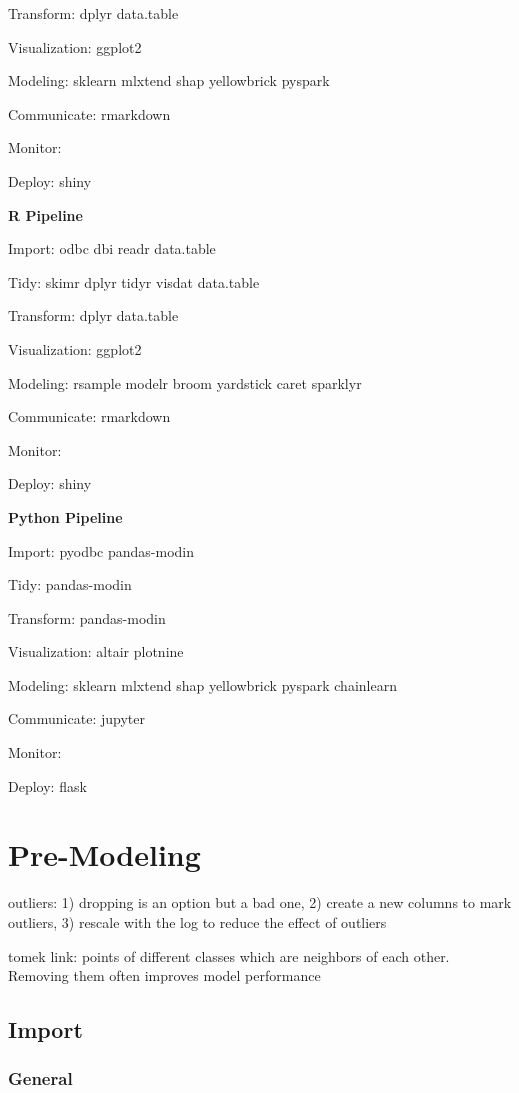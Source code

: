 \documentclass[]{book}
\begin{document}
Transform: dplyr data.table

Visualization: ggplot2

Modeling: sklearn mlxtend shap yellowbrick pyspark

Communicate: rmarkdown

Monitor:

Deploy: shiny

\textbf{R Pipeline}

Import: odbc dbi readr data.table

Tidy: skimr dplyr tidyr visdat data.table

Transform: dplyr data.table

Visualization: ggplot2

Modeling: rsample modelr broom yardstick caret sparklyr

Communicate: rmarkdown

Monitor:

Deploy: shiny

\textbf{Python Pipeline}

Import: pyodbc pandas-modin

Tidy: pandas-modin

Transform: pandas-modin

Visualization: altair plotnine

Modeling: sklearn mlxtend shap yellowbrick pyspark chainlearn

Communicate: jupyter

Monitor:

Deploy: flask

\hypertarget{pre-modeling}{%
\chapter{Pre-Modeling}\label{pre-modeling}}

outliers: 1) dropping is an option but a bad one, 2) create a new columns to mark outliers, 3) rescale with the log to reduce the effect of outliers

tomek link: points of different classes which are neighbors of each other. Removing them often improves model performance

\hypertarget{import}{%
\section{Import}\label{import}}

\hypertarget{general}{%
\subsection{General}\label{general}}
\end{document}
